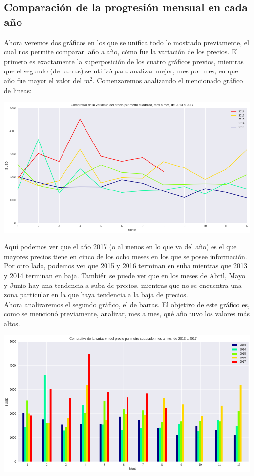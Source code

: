 \documentclass[a4paper, 10pt]{article}
\newcommand\tab[1][0.5cm]{\hspace*{#1}}
\begin{document}
			\subsection{Comparación de la progresión mensual en cada año}
				Ahora veremos dos gráficos en los que se unifica todo lo mostrado previamente, el cual nos permite comparar, año a
				año, cómo fue la variación de los precios. El primero es exactamente la superposición de los cuatro gráficos
				previos, mientras que el segundo (de barras) se utilizó para analizar mejor, mes por mes, en que año fue mayor
				el valor del $m^2$.
				\tab Comenzaremos analizando el mencionado gráfico de lineas:
				\begin{center}
					\includegraphics[width=\textwidth]{images/m2ProgressionLineComparison}
				\end{center}
				\tab Aquí podemos ver que el año 2017 (o al menos en lo que va del año) es el que mayores precios tiene en cinco de 
				los ocho meses en los que se posee información. Por otro lado, podemos ver que 2015 y 2016 terminan en suba mientras
				que 2013 y 2014 terminan en baja. También se puede ver que en los meses de Abril, Mayo y Junio hay una tendencia a
				suba de precios, mientras que no se encuentra una zona particular en la que haya tendencia a la baja de precios. \\
				\tab Ahora analizaremos el segundo gráfico, el de barras. El objetivo de este gráfico es, como se mencionó
				previamente, analizar, mes a mes, qué año tuvo los valores más altos.
				\begin{center}
					\includegraphics[width=\textwidth]{images/m2ProgressionBarComparison}
				\end{center}
\end{document}

